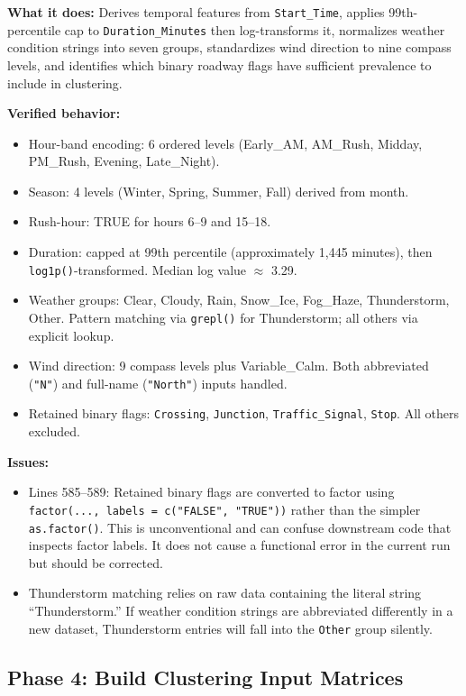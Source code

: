 \documentclass[11pt]{article}
\begin{document}
\textbf{What it does:} Derives temporal features from \texttt{Start\_Time}, applies
99th-percentile cap to \texttt{Duration\_Minutes} then log-transforms it, normalizes
weather condition strings into seven groups, standardizes wind direction to nine
compass levels, and identifies which binary roadway flags have sufficient prevalence
to include in clustering.

\textbf{Verified behavior:}
\begin{itemize}
\item Hour-band encoding: 6 ordered levels (Early\_AM, AM\_Rush, Midday, PM\_Rush,
  Evening, Late\_Night).
\item Season: 4 levels (Winter, Spring, Summer, Fall) derived from month.
\item Rush-hour: TRUE for hours 6--9 and 15--18.
\item Duration: capped at 99th percentile (approximately 1{,}445 minutes), then
  \texttt{log1p()}-transformed. Median log value $\approx$ 3.29.
\item Weather groups: Clear, Cloudy, Rain, Snow\_Ice, Fog\_Haze, Thunderstorm, Other.
  Pattern matching via \texttt{grepl()} for Thunderstorm; all others via explicit
  lookup.
\item Wind direction: 9 compass levels plus Variable\_Calm. Both abbreviated
  (\texttt{"N"}) and full-name (\texttt{"North"}) inputs handled.
\item Retained binary flags: \texttt{Crossing}, \texttt{Junction},
  \texttt{Traffic\_Signal}, \texttt{Stop}. All others excluded.
\end{itemize}

\textbf{Issues:}
\begin{itemize}
\item Lines 585--589: Retained binary flags are converted to factor using
  \texttt{factor(..., labels = c("FALSE", "TRUE"))} rather than the simpler
  \texttt{as.factor()}. This is unconventional and can confuse downstream code
  that inspects factor labels. It does not cause a functional error in the current
  run but should be corrected.
\item Thunderstorm matching relies on raw data containing the literal string
  ``Thunderstorm.'' If weather condition strings are abbreviated differently in
  a new dataset, Thunderstorm entries will fall into the \texttt{Other} group
  silently.
\end{itemize}

\subsection{Phase 4: Build Clustering Input Matrices}
\end{document}
